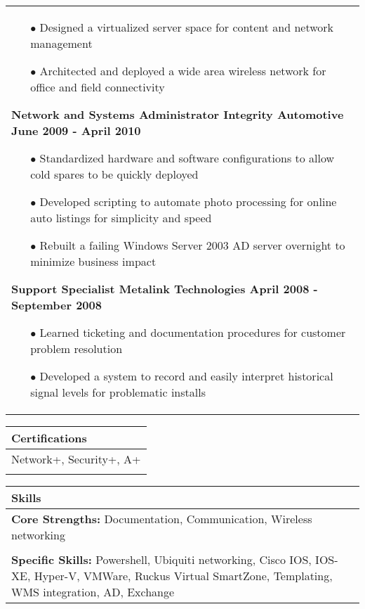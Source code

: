 \documentclass{article}
\begin{document}
\begin{tabular}{p{\dimexpr\linewidth-2\tabcolsep}}
 \begin{itemize}
	\item[$\bullet$]Designed a virtualized server space for content and network management
	\item[$\bullet$]Architected and deployed a wide area wireless network for office and field connectivity
  \end{itemize}
  {\bfseries Network and Systems Administrator \qquad Integrity Automotive \hfill June 2009 - April 2010}
 \begin{itemize}
	\item[$\bullet$]Standardized hardware and software configurations to allow cold spares to be quickly deployed
	\item[$\bullet$]Developed scripting to automate photo processing for online auto listings for simplicity and speed
	\item[$\bullet$]Rebuilt a failing Windows Server 2003 AD server overnight to minimize business impact
 \end{itemize}
   {\bfseries Support Specialist \hfill Metalink Technologies \quad \qquad April 2008 - September 2008}
 \begin{itemize}
 	\item[$\bullet$]Learned ticketing and documentation procedures for customer problem resolution
 	\item[$\bullet$]Developed a system to record and easily interpret historical signal levels for problematic installs
 \end{itemize}
\end{tabular}
\begin{tabular}{p{\dimexpr\linewidth-2\tabcolsep}}
	\textbf{Certifications} \\
	\hline
	\textnormal{Network+, Security+, A+} \\
	\\
\end{tabular}
\begin{tabular}{p{\dimexpr\linewidth-2\tabcolsep}}
	\textbf{Skills} \\
	\hline
	\textbf{Core Strengths:} \textnormal{Documentation, Communication, Wireless networking} \\
	\\
	\textbf{Specific Skills:} \textnormal{Powershell, Ubiquiti networking, Cisco IOS, IOS-XE, Hyper-V, VMWare, Ruckus Virtual SmartZone, Templating, WMS integration, AD, Exchange}
\end{tabular}
\end{document}

